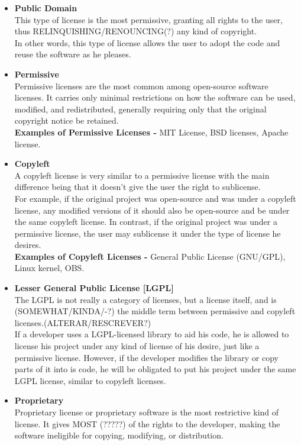 \begin{itemize}

  \item \textbf{Public Domain}  \\
  This type of license is the most permissive, granting all rights to the user, thus RELINQUISHING/RENOUNCING(?) any kind of copyright. \\
  In other words, this type of license allows the user to adopt the code and reuse the software as he pleases.
 
  
  \item \textbf{Permissive} \\
  Permissive licenses are the most common among open-source software licenses. It carries only minimal restrictions on how the software can be used, modified, and redistributed, generally requiring only that the original copyright notice be retained.\\
  \textbf{Examples of Permissive Licenses -} MIT License, BSD licenses, Apache license.
  
  \item \textbf{Copyleft} \\
  A copyleft license is very similar to a permissive license with the main difference being that it doesn't give the user the right to sublicense. \\
  For example, if the original project was open-source and was under a copyleft license, any modified versions of it should also be open-source and be under the same copyleft license. In contrast, if the original project was under a permissive license, the user may sublicense it under the type of license he desires.\\
  \textbf{Examples of Copyleft Licenses -} General Public License (GNU/GPL), Linux kernel, OBS.
  
    
  \item \textbf{Lesser General Public License [LGPL]} \\
  The LGPL is not really a category of licenses, but a license itself, and is (SOMEWHAT/KINDA/-?) the middle term between permissive and copyleft licenses.(ALTERAR/RESCREVER?) \\
  If a developer uses a LGPL-licensed library to aid his code, he is allowed to license his project under any kind of license of his desire, just like a permissive license. However, if the developer modifies the library or copy parts of it into is code, he will be obligated to put his project under the same LGPL license, similar to copyleft licenses.
  
  
  \item \textbf{Proprietary}\\
  Proprietary license or proprietary software is the most restrictive kind of license. It gives MOST (?????) of the rights to the developer, making the software ineligible for copying, modifying, or distribution.

  
\end{itemize}








